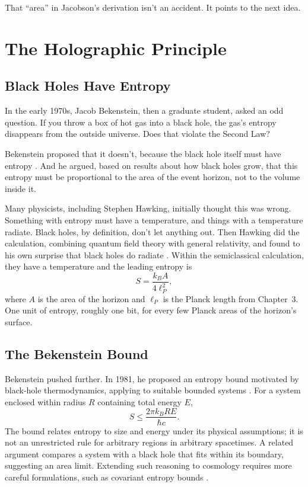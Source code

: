 That ``area'' in Jacobson's derivation isn't an accident. It points to the next idea.

\section{The Holographic Principle}

\subsection{Black Holes Have Entropy}

In the early 1970s, Jacob Bekenstein, then a graduate student, asked an odd question. If you throw a box of hot gas into a black hole, the gas's entropy disappears from the outside universe. Does that violate the Second Law?

Bekenstein proposed that it doesn't, because the black hole itself must have entropy \cite{bekenstein1973}. And he argued, based on results about how black holes grow, that this entropy must be proportional to the area of the event horizon, not to the volume inside it.

Many physicists, including Stephen Hawking, initially thought this was wrong. Something with entropy must have a temperature, and things with a temperature radiate. Black holes, by definition, don't let anything out. Then Hawking did the calculation, combining quantum field theory with general relativity, and found to his own surprise that black holes do radiate \cite{hawking1975}. Within the semiclassical calculation, they have a temperature and the leading entropy is
\[
S = \frac{k_B A}{4 \ell_P^2},
\]
where \(A\) is the area of the horizon and \(\ell_P\) is the Planck length from Chapter~3. One unit of entropy, roughly one bit, for every few Planck areas of the horizon's surface.

\subsection{The Bekenstein Bound}

Bekenstein pushed further. In 1981, he proposed an entropy bound motivated by black-hole thermodynamics, applying to suitable bounded systems \cite{bekenstein1981}. For a system enclosed within radius \(R\) containing total energy \(E\),
\[
S \le \frac{2\pi k_B R E}{\hbar c}.
\]
The bound relates entropy to size and energy under its physical assumptions; it is not an unrestricted rule for arbitrary regions in arbitrary spacetimes. A related argument compares a system with a black hole that fits within its boundary, suggesting an area limit. Extending such reasoning to cosmology requires more careful formulations, such as covariant entropy bounds \cite{bousso2002}.

